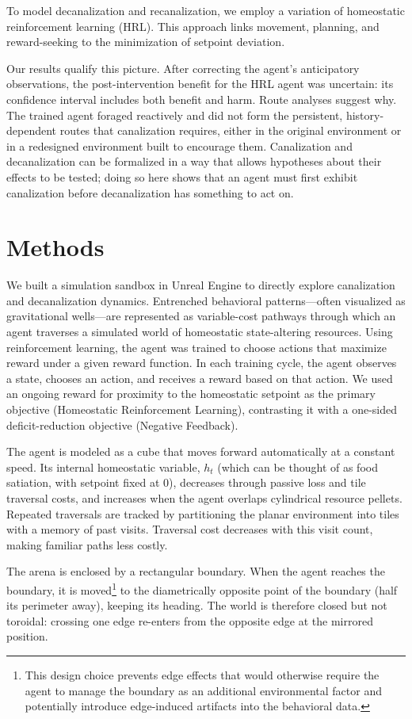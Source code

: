 \documentclass[12pt,fleqn]{article}
\begin{document}
To model decanalization and recanalization, we employ a variation of homeostatic reinforcement learning (HRL). This approach links movement, planning, and reward-seeking to the minimization of setpoint deviation. 

Our results qualify this picture. After correcting the agent's anticipatory observations, the post-intervention benefit for the HRL agent was uncertain: its confidence interval includes both benefit and harm. Route analyses suggest why. The trained agent foraged reactively and did not form the persistent, history-dependent routes that canalization requires, either in the original environment or in a redesigned environment built to encourage them. Canalization and decanalization can be formalized in a way that allows hypotheses about their effects to be tested; doing so here shows that an agent must first exhibit canalization before decanalization has something to act on.

\section{Methods}

We built a simulation sandbox in Unreal Engine to directly explore canalization and decanalization dynamics. Entrenched behavioral patterns---often visualized as gravitational wells---are represented as variable-cost pathways through which an agent traverses a simulated world of homeostatic state-altering resources. Using reinforcement learning, the agent was trained to choose actions that maximize reward under a given reward function. In each training cycle, the agent observes a state, chooses an action, and receives a reward based on that action. We used an ongoing reward for proximity to the homeostatic setpoint as the primary objective (Homeostatic Reinforcement Learning), contrasting it with a one-sided deficit-reduction objective (Negative Feedback).

The agent is modeled as a cube that moves forward automatically at a constant speed. Its internal homeostatic variable, $h_t$ (which can be thought of as food satiation, with setpoint fixed at 0), decreases through passive loss and tile traversal costs, and increases when the agent overlaps cylindrical resource pellets. Repeated traversals are tracked by partitioning the planar environment into tiles with a memory of past visits. Traversal cost decreases with this visit count, making familiar paths less costly.

The arena is enclosed by a rectangular boundary. When the agent reaches the boundary, it is moved\footnote{This design choice prevents edge effects that would otherwise require the agent to manage the boundary as an additional environmental factor and potentially introduce edge-induced artifacts into the behavioral data.} to the diametrically opposite point of the boundary (half its perimeter away), keeping its heading. The world is therefore closed but not toroidal: crossing one edge re-enters from the opposite edge at the mirrored position.
\end{document}
